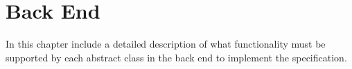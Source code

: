 \chapter{Back End}
\label{chap:back_end}

In this chapter include a detailed description of what functionality must be
supported by each abstract class in the back end to implement the
specification.

